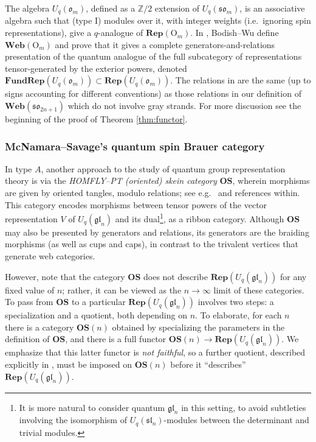 \documentclass[10pt]{amsart}
\numberwithin{equation}{section}
\theoremstyle{definition}
\renewcommand{\to}{\rightarrow}
\newcommand{\sln}[1][n]{\mathfrak{sl}_{#1}}
\newcommand{\gln}[1][n]{\mathfrak{gl}_{#1}}
\newcommand{\son}[1][2n+1]{\mathfrak{so}_{#1}}
\newcommand{\Rep}{\mathbf{Rep}}
\newcommand{\FRep}{\mathbf{FundRep}}
\newcommand{\Web}{\mathbf{Web}}
\begin{document}
The algebra $U_q(\mathfrak{o}_m)$, 
defined as a $\mathbb{Z}/2$ extension of $U_q(\mathfrak{so}_m)$, 
is an associative algebra such that (type I) modules over it, 
with integer weights (i.e.~ignoring spin representations), 
give a $q$-analogue of $\Rep(\mathrm{O}_m)$. 
In \cite{BodWu}, Bodish--Wu define $\Web(\mathrm{O}_m)$ 
and prove that it gives a complete generators-and-relations presentation 
of the quantum analogue of the full subcategory of representations tensor-generated 
by the exterior powers, 
denoted $\FRep(U_q(\mathfrak{o}_m))\subset \Rep(U_q(\mathfrak{o}_m))$. 
The relations in \cite[Definition 1.4]{BodWu} are the same (up to signs accounting for different conventions)
as those relations in our definition of $\Web(\son)$ which do not involve gray strands. 
For more discussion see the beginning of the proof of Theorem \ref{thm:functor}.

\subsubsection{McNamara--Savage's quantum spin Brauer category}

In type $A$, another approach to the study of quantum group representation theory 
is via the \emph{HOMFLY--PT (oriented) skein category} $\mathbf{OS}$, 
wherein morphisms are given by oriented tangles, modulo relations;
see e.g.~\cite{BrunHOMFLY} and references within.
This category encodes morphisms between tensor powers of the vector 
representation $V$ of $U_q(\gln)$ and its dual\footnote{It is more natural to consider quantum $\gln$ in this setting, 
to avoid subtleties involving the isomorphism of $U_q(\sln)$-modules between the determinant and trivial modules.}, 
as a ribbon category. 
Although $\mathbf{OS}$ may also be presented by generators and relations, 
its generators are the braiding morphisms (as well as cups and caps), 
in contrast to the trivalent vertices that generate web categories.

However, note that the category $\mathbf{OS}$ does not describe $\Rep(U_q(\gln))$ for any fixed value of $n$; 
rather, it can be viewed as the $n \to \infty$ limit of these categories. 
To pass from $\mathbf{OS}$ to a particular $\Rep(U_q(\gln))$ involves two steps: 
a specialization and a quotient, both depending on $n$.
To elaborate, for each $n$ there is a category $\mathbf{OS}(n)$ obtained by specializing the 
parameters in the definition of $\mathbf{OS}$, 
and there is a full functor $\mathbf{OS}(n) \to \Rep(U_q(\gln))$.
We emphasize that this latter functor is \emph{not faithful}, 
so a further quotient, described explicitly in \cite[Theorem 1.3]{BrunHOMFLY}, 
must be imposed on $\mathbf{OS}(n)$ before it ``describes'' $\Rep(U_q(\gln))$. 
\end{document}
